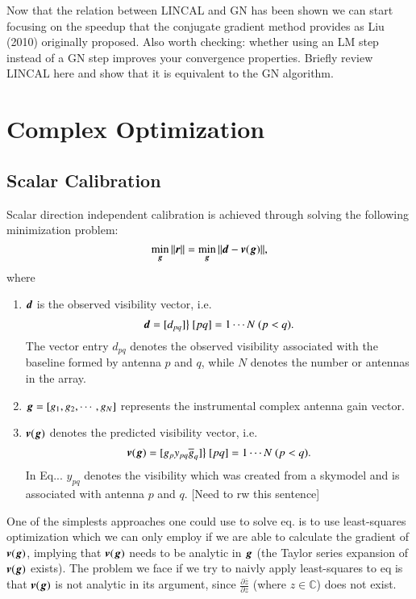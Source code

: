 \documentclass[a4paper,fleqn,usenatbib]{mnras}
\newcommand{\br}{\bmath{r}}
\newcommand{\bg}{\bmath{g}}
\newcommand{\bd}{\bmath{d}}
\newcommand{\bv}{\bmath{v}}
\newcommand{\conj}[1]{\overline{#1}}
\begin{document}
Now that the relation between LINCAL and GN has been shown we can start focusing on the speedup that the conjugate gradient method provides as Liu (2010) originally proposed.
Also worth checking: whether using an LM step instead of a GN step improves your convergence properties.
Briefly review LINCAL here and show that it is equivalent to the GN algorithm.

\section{Complex Optimization}
\subsection{Scalar Calibration}
Scalar direction independent calibration is achieved through solving the following minimization problem:
\begin{equation}
\min_{\bg}\|\br\| = \min_{\bg}\|\bd - \bv(\bg)\|, 
\end{equation}
where
\begin{enumerate}
 \item $\bd$ is the observed visibility vector, i.e. 
 \begin{equation}
  \bd = [d_{pq}] \big \} ~ [pq] = 1\cdots N ~ (p<q).
 \end{equation}
 The vector entry $d_{pq}$ denotes the observed visibility associated with the baseline formed by antenna $p$ and $q$, while $N$ denotes the number or antennas
 in the array. 
 \item $\bg = [g_1,g_2,\cdots,g_N]$ represents the instrumental complex antenna gain vector.
 \item $\bv(\bg)$ denotes the predicted visibility vector, i.e.
 \begin{equation}
  \bv(\bg) = [g_p y_{pq}\conj{g}_q]  \big \} ~ [pq] = 1\cdots N ~ (p<q).
 \end{equation}
 In Eq... $y_{pq}$ denotes the visibility which was created from a skymodel and is associated with antenna $p$ and $q$. [Need to rw this sentence] 
\end{enumerate}

One of the simplests approaches one could use to solve eq. is to use least-squares optimization which we can only employ if we are able to calculate the gradient of $\bv(\bg)$,
implying that $\bv(\bg)$ needs to be analytic in $\bg$ (the Taylor series expansion of $\bv(\bg)$ exists).
The problem we face if we try to naivly apply least-squares to eq is that $\bv(\bg)$ is not analytic in its argument, since $\frac{\partial \conj{z}}{\partial z}$ (where 
$z \in \mathbb{C}$) does not exist.
\end{document}
